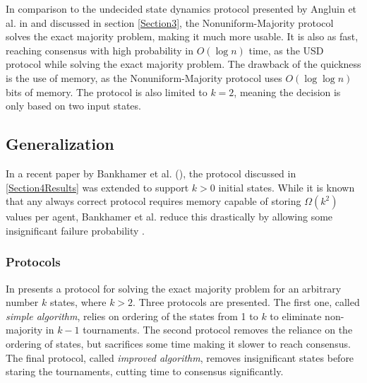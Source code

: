 In comparison to the undecided state dynamics protocol presented by Angluin et al. in \cite{angluinSimplePopulationProtocol2008} and discussed in section \ref{Section3}, the Nonuniform-Majority protocol solves the exact majority problem, making it much more usable. It is also as fast, reaching consensus with high probability in $O(\log n)$ time, as the USD protocol while solving the exact majority problem. The drawback of the quickness is the use of memory, as the Nonuniform-Majority protocol uses $O(\log \log n)$ bits of memory.  The protocol is also limited to $k = 2$, meaning the decision is only based on two input states. 

\subsection{Generalization}

In a recent paper by Bankhamer et al. (\cite{bankhamerPopulationProtocolsExact2022}), the protocol discussed in \ref{Section4Results} was extended to support $k > 0$ initial states.
While it is known that any always correct protocol requires memory capable of storing $\Omega(k^2)$ values per agent, Bankhamer et al. reduce this drastically by allowing some insignificant failure probability \cite{ongaroSearchUnderstandableConsensus}. 

\subsubsection{Protocols} \label{441}

In \cite{bankhamerPopulationProtocolsExact2022} presents a protocol for solving the exact majority problem for an arbitrary number $k$ states, where $k > 2$. Three protocols are presented. The first one, called \emph{simple algorithm}, relies on ordering of the states from 1 to $k$ to eliminate non-majority in $k-1$ tournaments. The second protocol removes the reliance on the ordering of states, but sacrifices some time making it slower to reach consensus. The final protocol, called \emph{improved algorithm}, removes insignificant states before staring the tournaments, cutting time to consensus significantly. 

